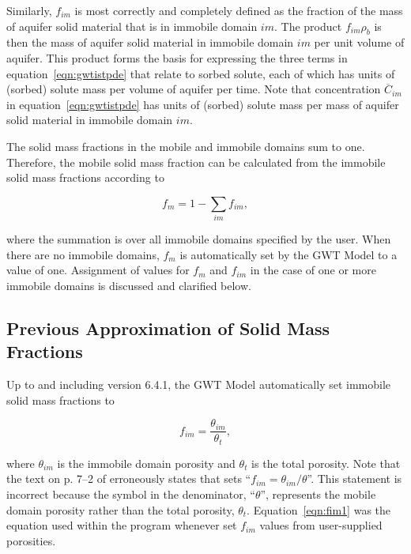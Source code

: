 Similarly, $f_{im}$ is most correctly and completely defined as the fraction of the mass of aquifer solid material that is in immobile domain $im$. The product $f_{im} \rho_b$ is then the mass of aquifer solid material in immobile domain $im$ per unit volume of aquifer. This product forms the basis for expressing the three terms in equation~\ref{eqn:gwtistpde} that relate to sorbed solute, each of which has units of (sorbed) solute mass per volume of aquifer per time. Note that concentration $\overline{C}_{im}$ in equation~\ref{eqn:gwtistpde} has units of (sorbed) solute mass per mass of aquifer solid material in immobile domain $im$.

The solid mass fractions in the mobile and immobile domains sum to one. Therefore, the mobile solid mass fraction can be calculated from the immobile solid mass fractions according to

\begin{equation}
\label{eqn:fm0}
f_m = 1 - \sum_{im}f_{im},
\end{equation}

\noindent where the summation is over all immobile domains specified by the user. When there are no immobile domains, $f_m$ is automatically set by the GWT Model to a value of one. Assignment of values for $f_m$ and $f_{im}$ in the case of one or more immobile domains is discussed and clarified below.

\subsection{Previous Approximation of Solid Mass Fractions} \label{sec:solidmassfrac1}

Up to and including \mf version 6.4.1, the GWT Model automatically set immobile solid mass fractions to

\begin{equation}
\label{eqn:fim1}
f_{im} = \frac{\theta_{im}}{\theta_t},
\end{equation}

\noindent where $\theta_{im}$ is the immobile domain porosity and $\theta_t$ is the total porosity. Note that the text on p. 7--2 of \cite{modflow6gwt} erroneously states that \mf sets ``$f_{im} = \theta_{im} / \theta$''. This statement is incorrect because the symbol in the denominator, ``$\theta$'', represents the mobile domain porosity rather than the total porosity, $\theta_t$. Equation~\ref{eqn:fim1} was the equation used within the program whenever \mf set $f_{im}$ values from user-supplied porosities.

